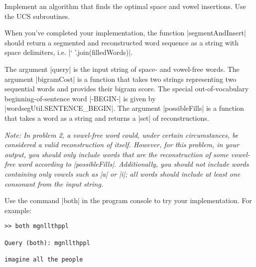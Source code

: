 \item {}
Implement an algorithm that finds the optimal space and vowel insertions.  Use
the UCS subroutines.

When you've completed your implementation, the function |segmentAndInsert|
should return a segmented and reconstructed word sequence as a string with space
delimiters, i.e. |` '.join(filledWords)|.

The argument |query| is the input string of space- and vowel-free words.  The
argument |bigramCost| is a function that takes two strings representing two
sequential words and provides their bigram score.  The special out-of-vocabulary
beginning-of-sentence word |-BEGIN-| is given by |wordsegUtil.SENTENCE_BEGIN|.
The argument |possibleFills| is a function that takes a word as a string and
returns a |set| of reconstructions.

{\em Note: In problem 2, a vowel-free word could, under certain circumstances,
be considered a valid reconstruction of itself. However, for this problem, in
your output, you should only include words that are the reconstruction of some
vowel-free word according to |possibleFills|.  Additionally, you should not
include words containing only vowels such as |a| or |i|; all words should
include at least one consonant from the input string.

Use the command |both| in the program console to try your implementation.  For
example:
\begin{lstlisting}
>> both mgnllthppl

Query (both): mgnllthppl

imagine all the people
\end{lstlisting}}
